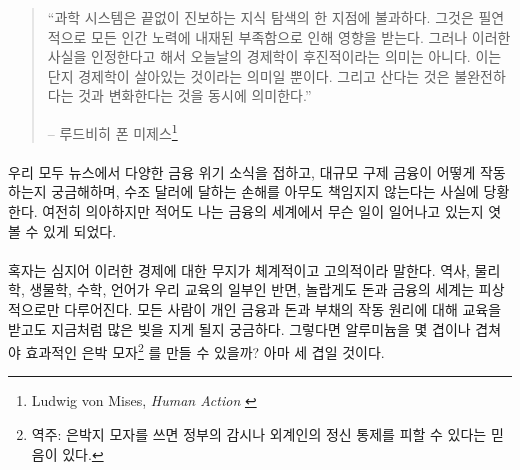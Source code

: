 \begin{quotation}\begin{samepage}
		\enquote{과학 시스템은 끝없이 진보하는 지식 탐색의 한 지점에 불과하다. 
			그것은 필연적으로 모든 인간 노력에 내재된 부족함으로 인해 영향을 받는다.
			그러나 이러한 사실을 인정한다고 해서 오늘날의 경제학이 후진적이라는 의미는 아니다.
			이는 단지 경제학이 살아있는 것이라는 의미일 뿐이다. 
			그리고 산다는 것은 불완전하다는 것과 변화한다는 것을 동시에 의미한다.}
		\begin{flushright} -- 루드비히 폰 미제스\footnote{Ludwig von Mises, \textit{Human Action}
				\cite{human-action}}
\end{flushright}\end{samepage}\end{quotation}


\paragraph{}
우리 모두 뉴스에서 다양한 금융 위기 소식을 접하고, 대규모 구제 금융이 어떻게 작동하는지 궁금해하며, 
수조 달러에 달하는 손해를 아무도 책임지지 않는다는 사실에 당황한다.
여전히 의아하지만 적어도 나는 금융의 세계에서 무슨 일이 일어나고 있는지 엿볼 수 있게 되었다.

\paragraph{}
혹자는 심지어 이러한 경제에 대한 무지가 체계적이고 고의적이라 말한다.
역사, 물리학, 생물학, 수학, 언어가 우리 교육의 일부인 반면, 
놀랍게도 돈과 금융의 세계는 피상적으로만 다루어진다. 
모든 사람이 개인 금융과 돈과 부채의 작동 원리에 대해 교육을 받고도 지금처럼 많은 빚을 지게 될지 궁금하다.
그렇다면 알루미늄을 몇 겹이나 겹쳐야 효과적인 은박 모자\footnote{역주: 은박지 모자를 쓰면 정부의 감시나 외계인의 정신 통제를 피할 수 있다는 믿음이 있다.}
를 만들 수 있을까? 아마 세 겹일 것이다.

